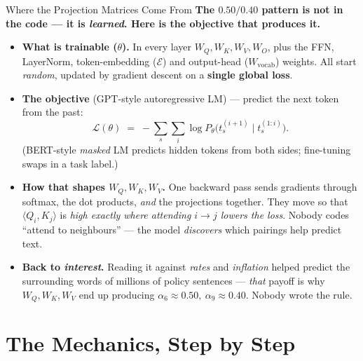 \begin{frame}{Where the Projection Matrices Come From}
\small
\textbf{The $0.50/0.40$ pattern is not in the code --- it is \emph{learned}. Here is the objective that produces it.}
\begin{itemize}
\item \textbf{What is trainable ($\theta$).} In every layer $W_{Q}, W_{K}, W_{V}, W_{O}$, plus the FFN, LayerNorm, token-embedding ($\mathcal{E}$) and output-head ($W_{\text{vocab}}$) weights. All start \emph{random}, updated by gradient descent on a \textbf{single global loss}.
\smallskip
\item \textbf{The objective} (GPT-style autoregressive LM) --- predict the next token from the past:
\[
   \mathcal{L}(\theta) \;=\; -\sum_{s}\sum_{i} \log P_{\theta}\bigl(t_{s}^{(i+1)} \mid t_{s}^{(1:i)}\bigr).
\]
(BERT-style \emph{masked} LM predicts hidden tokens from both sides; fine-tuning swaps in a task label.)
\smallskip
\item \textbf{How that shapes $W_Q, W_K, W_V$.} One backward pass sends gradients through softmax, the dot products, \emph{and} the projections together. They move so that $\langle Q_i, K_j\rangle$ is \emph{high exactly where attending $i\!\to\!j$ lowers the loss}. Nobody codes ``attend to neighbours'' --- the model \emph{discovers} which pairings help predict text.
\smallskip
\item \textbf{Back to \emph{interest}.} Reading it against \emph{rates} and \emph{inflation} helped predict the surrounding words of millions of policy sentences --- \emph{that} payoff is why $W_Q, W_K, W_V$ end up producing $\alpha_6\approx0.50,\ \alpha_9\approx0.40$. Nobody wrote the rule.
\end{itemize}
\end{frame}

\section{The Mechanics, Step by Step}

